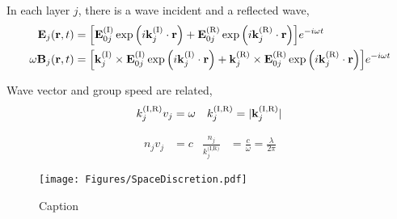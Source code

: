 In each layer $j$, there is a wave incident  and a reflected  wave,
\begin{align*}
	\vb{E}_j\pqty{\vb{r},t}       & =
	\bqty{
	\vb{E}_{0j}^{(\text{I})}\exp\pqty{i\vb{k}_j^{(\text{I})}\cdot\vb{r}} +
	\vb{E}_{0j}^{(\text{R})}\exp\pqty{i\vb{k}_j^{(\text{R})}\cdot\vb{r}}
	} e^{-i \omega t}                 \\
	\omega\vb{B}_j\pqty{\vb{r},t} & =
	\bqty{
	\vb{k}_j^{(\text{I})}\times\vb{E}_{0j}^{(\text{I})}\exp\pqty{i\vb{k}_j^{(\text{I})}\cdot\vb{r}} +
	\vb{k}_j^{(\text{R})}\times\vb{E}_{0j}^{(\text{R})}\exp\pqty{i\vb{k}_j^{(\text{R})}\cdot\vb{r}}
	} e^{-i \omega t}
\end{align*}

Wave vector and group speed are related,
\begin{align*}
	k_j^{\text{(I,R)}}v_j & = \omega & k_j^{\text{(I,R)}} = \abs*{\vb{k}_j^{\text{(I,R)}}}
\end{align*}

\begin{align*}
	n_j v_j & = c & \frac{n_j}{k_j^{\text{(I,R)}}} & = \frac{c}{\omega} = \frac{\lambda}{2\pi}
\end{align*}


\begin{figure}
	\begin{center}
		{\texttt{[image: Figures/SpaceDiscretion.pdf]}
		}
		\caption{
			Caption
		}
		\label{fig:1}
	\end{center}
\end{figure}

